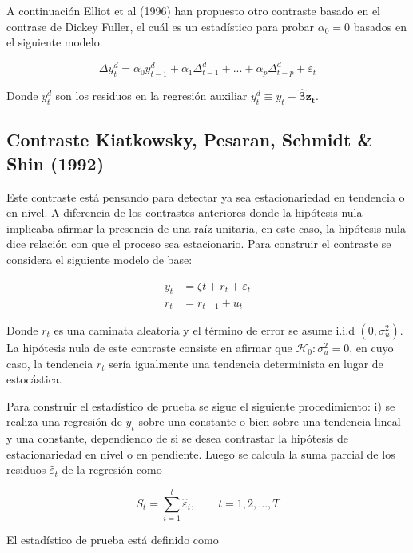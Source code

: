\documentclass[12pt, twoside]{book}\usepackage[]{graphicx}\usepackage[]{color}
\numberwithin{equation}{section}
\numberwithin{theorem}{section}
\numberwithin{teorema}{section}
\numberwithin{defi}{section}
\numberwithin{prop}{section}
\numberwithin{defi}{section}
\theoremstyle{plain}
\begin{document}
A continuación Elliot et al (1996) han propuesto otro contraste basado en el contrase de Dickey Fuller, el cuál es un estadístico para probar $\alpha_{0}=0$ basados en el siguiente modelo. 

\begin{equation}
\Delta y_{t}^{d} = \alpha_{0}y_{t-1}^{d}+\alpha_{1}\Delta _{t-1}^{d}+...+\alpha_{p}\Delta _{t-p}^{d}+\varepsilon_{t}
\end{equation}

Donde $y_{t}^{d}$ son los residuos en la regresión auxiliar $y_{t}^{d}\equiv y_{t}-\boldsymbol{\hat{\beta}z_{t}}.$  

\subsection{Contraste Kiatkowsky, Pesaran, Schmidt \& Shin (1992)}

Este contraste está pensando para detectar ya sea estacionariedad en tendencia o en nivel. A diferencia de los contrastes anteriores donde la hipótesis nula implicaba afirmar la presencia de una raíz unitaria, en este caso, la hipótesis nula dice relación con que el proceso sea estacionario. Para construir el contraste se considera el siguiente modelo de base: 

\begin{align}
y_{t} & = \zeta t+r_{t}+\varepsilon_{t} \\  
r_{t} & = r_{t-1}+u_{t}
\end{align}

Donde $r_{t}$ es una caminata aleatoria y el término de error se asume i.i.d $(0,\sigma^{2}_{u})$. La hipótesis nula de este contraste consiste en afirmar que $\mathcal{H}_{0}: \sigma^{2}_{u}=0$, en cuyo caso, la tendencia $r_{t}$ sería igualmente una tendencia determinista en lugar de estocástica. 

Para construir el estadístico de prueba se sigue el siguiente procedimiento: i) se realiza una regresión de $y_{t}$ sobre una constante o bien sobre una tendencia lineal y una constante, dependiendo de si se desea contrastar la hipótesis de estacionariedad en nivel o en pendiente. Luego se calcula la suma parcial de los residuos $\hat{\varepsilon}_{t}$ de la regresión como 

\begin{equation}
S_{t} = \sum_{i=1}^{t}\hat{\varepsilon}_{i}, \qquad t=1,2,...,T
\end{equation}

El estadístico de prueba está definido como 
\end{document}
